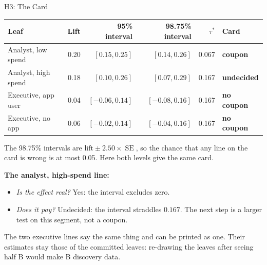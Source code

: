 \documentclass[aspectratio=169, 11pt, handout]{beamer}
\newcommand{\SE}{\operatorname{SE}}
\begin{document}
\begin{frame}{H3: The Card}

\begin{center}
\small
\begin{tabular}{lrrrrl}
\toprule
\textbf{Leaf} & \textbf{Lift} & \textbf{95\% interval} & \textbf{98.75\% interval} & $\tau^\ast$ & \textbf{Card} \\
\midrule
Analyst, low spend & 0.20 & $[0.15, 0.25]$ & $[0.14, 0.26]$ & 0.067 & \textcolor{sbgreen}{\textbf{coupon}} \\
Analyst, high spend & 0.18 & $[0.10, 0.26]$ & $[0.07, 0.29]$ & 0.167 & \textbf{undecided} \\
Executive, app user & 0.04 & $[-0.06, 0.14]$ & $[-0.08, 0.16]$ & 0.167 & \textcolor{warnred}{\textbf{no coupon}} \\
Executive, no app & 0.06 & $[-0.02, 0.14]$ & $[-0.04, 0.16]$ & 0.167 & \textcolor{warnred}{\textbf{no coupon}} \\
\bottomrule
\end{tabular}
\end{center}

\smallskip

\small The 98.75\% intervals are $\text{lift} \pm 2.50 \times \SE$, so the chance that any line on the card is wrong is at most 0.05. Here both levels give the same card.

\normalsize
\medskip

\textbf{The analyst, high-spend line:}
\begin{itemize}
  \item \emph{Is the effect real?} Yes: the interval excludes zero.
  \item \emph{Does it pay?} Undecided: the interval straddles $0.167$. The next step is a larger test on this segment, not a coupon.
\end{itemize}

\medskip

The two executive lines say the same thing and can be printed as one. Their estimates stay those of the committed leaves: re-drawing the leaves after seeing half B would make B discovery data.
\end{frame}
\end{document}
